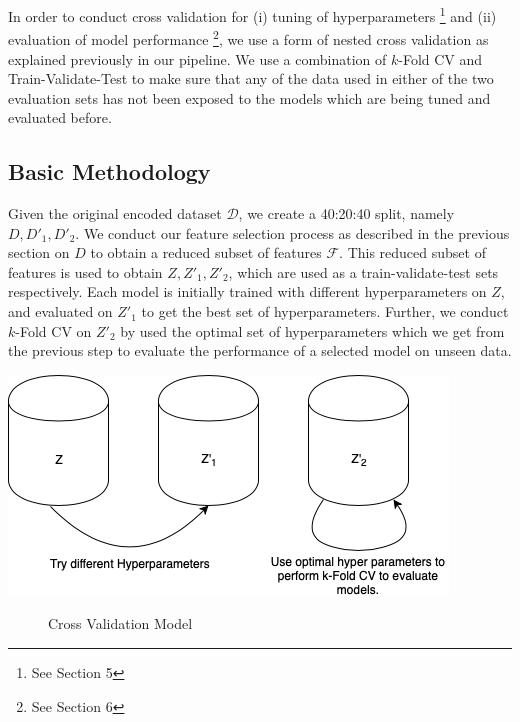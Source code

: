 \documentclass[fleqn]{article}
\begin{document}
    In order to conduct cross validation for (i) tuning of hyperparameters
    \footnote{See Section 5} and (ii) evaluation of model performance \footnote{See Section 6},
    we use a form of nested cross validation as explained previously in our pipeline. We
    use a combination of $k$-Fold CV and Train-Validate-Test to make sure that any of the
    data used in either of the two evaluation sets has not been exposed to the models
    which are being tuned and evaluated before.

    \subsection{Basic Methodology}
    Given the original encoded dataset $ \mathcal{D} $, we create a 40:20:40 split,
    namely $ D, D'_1, D'_2 $. We conduct our feature selection process as described in the
    previous section on $ D $ to obtain a reduced subset of features $ \mathcal{F} $.
    This reduced subset of features is used to obtain $ Z, Z'_1, Z'_2 $, which are used
    as a train-validate-test sets respectively. Each model is initially trained with
    different hyperparameters on $ Z $, and evaluated on $ Z'_1 $ to get the best set of
    hyperparameters. Further, we conduct $k$-Fold CV on $ Z'_2 $ by used the optimal set of
    hyperparameters which we get from the previous step to evaluate the performance of a
    selected model on unseen data.

    \begin{center}
        \includegraphics[scale=0.4]{tvt.png}
        \begin{figure}[!h]
            \caption{Cross Validation Model}
        \end{figure}
    \end{center}
\end{document}
